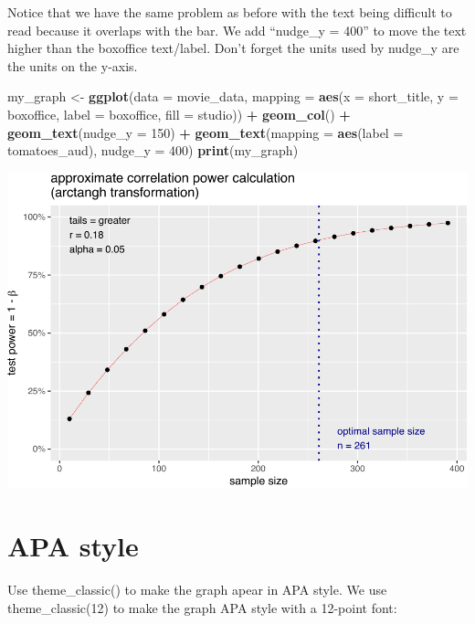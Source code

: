 \documentclass[
]{krantz}
\makeatletter
\newenvironment{Shaded}{\begin{snugshade}}{\end{snugshade}}
\newcommand{\DataTypeTok}[1]{\textcolor[rgb]{0.27,0.27,0.27}{#1}}
\newcommand{\DecValTok}[1]{\textcolor[rgb]{0.06,0.06,0.06}{#1}}
\newcommand{\KeywordTok}[1]{\textcolor[rgb]{0.27,0.27,0.27}{\textbf{#1}}}
\newcommand{\NormalTok}[1]{#1}
\newcommand{\OperatorTok}[1]{\textcolor[rgb]{0.43,0.43,0.43}{\textbf{#1}}}
\newcommand{\StringTok}[1]{\textcolor[rgb]{0.5,0.5,0.5}{#1}}
\newenvironment{kframe}{%
\medskip{}
\setlength{\fboxsep}{.8em}
 \def\at@end@of@kframe{}%
 \ifinner\ifhmode%
  \def\at@end@of@kframe{\end{minipage}}%
  \begin{minipage}{\columnwidth}%
 \fi\fi%
 \def\FrameCommand##1{\hskip\@totalleftmargin \hskip-\fboxsep
 \colorbox{shadecolor}{##1}\hskip-\fboxsep
     \hskip-\linewidth \hskip-\@totalleftmargin \hskip\columnwidth}%
 \MakeFramed {\advance\hsize-\width
   \@totalleftmargin\z@ \linewidth\hsize
   \@setminipage}}%
 {\par\unskip\endMakeFramed%
 \at@end@of@kframe}
\renewenvironment{Shaded}{\begin{kframe}}{\end{kframe}}
\makeatother
\begin{document}
Notice that we have the same problem as before with the text being difficult to read because it overlaps with the bar. We add ``nudge\_y = 400'' to move the text higher than the boxoffice text/label. Don't forget the units used by nudge\_y are the units on the y-axis.

\begin{Shaded}
\begin{Highlighting}[]
\NormalTok{my_graph <-}\StringTok{ }\KeywordTok{ggplot}\NormalTok{(}\DataTypeTok{data =}\NormalTok{ movie_data,}
           \DataTypeTok{mapping =} \KeywordTok{aes}\NormalTok{(}\DataTypeTok{x =}\NormalTok{ short_title,}
                         \DataTypeTok{y =}\NormalTok{ boxoffice,}
                         \DataTypeTok{label =}\NormalTok{ boxoffice, }
                         \DataTypeTok{fill =}\NormalTok{ studio)) }\OperatorTok{+}
\StringTok{  }\KeywordTok{geom_col}\NormalTok{() }\OperatorTok{+}
\StringTok{  }\KeywordTok{geom_text}\NormalTok{(}\DataTypeTok{nudge_y =} \DecValTok{150}\NormalTok{)  }\OperatorTok{+}
\StringTok{  }\KeywordTok{geom_text}\NormalTok{(}\DataTypeTok{mapping =} \KeywordTok{aes}\NormalTok{(}\DataTypeTok{label =}\NormalTok{ tomatoes_aud), }
            \DataTypeTok{nudge_y =} \DecValTok{400}\NormalTok{) }
\KeywordTok{print}\NormalTok{(my_graph)}
\end{Highlighting}
\end{Shaded}

\includegraphics[width=0.65\linewidth]{bookdown_files/figure-latex/unnamed-chunk-258-1}

\newpage

\hypertarget{apa-style}{%
\section{APA style}\label{apa-style}}

Use theme\_classic() to make the graph apear in APA style. We use theme\_classic(12) to make the graph APA style with a 12-point font:
\end{document}
